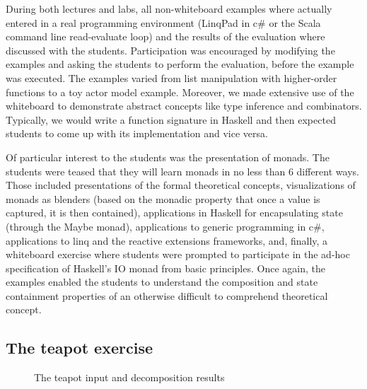 \documentclass[conference]{sig-alternate}
\begin{document}
During both lectures and labs, all non-whiteboard examples where actually
entered in a real programming environment (LinqPad in {\sc c\#} or the Scala
command line read-evaluate loop) and the results of the evaluation where
discussed with the students. Participation was encouraged by modifying the
examples and asking the students to perform the evaluation, before the example
was executed.
The examples varied from list manipulation with higher-order
functions to a toy actor model example.
Moreover, we made extensive use of the whiteboard to demonstrate abstract
concepts like type inference and combinators. Typically, we would
write a function signature in Haskell and then expected students to come up 
with its implementation and vice versa.

Of particular interest to the students was the presentation of monads. The
students were teased that they will learn monads in no less than 6 different
ways. Those included presentations of the formal theoretical concepts,
visualizations of monads as blenders (based on the monadic property that once a
value is captured, it is then contained), applications in Haskell for
encapsulating state (through the \textsf{Maybe} monad), applications to generic
programming in {\sc c\#}, applications to {\sc linq} and the reactive extensions
frameworks, and, finally, a whiteboard exercise where students were prompted to
participate in the ad-hoc specification of Haskell's \textsf{IO} monad from
basic principles. Once again, the examples enabled the students to understand
the composition and state containment properties of an otherwise difficult to
comprehend theoretical concept.

\subsection{The teapot exercise}

\begin{figure*}
\centering
\label{fig:teapots}

\caption[]{The teapot input and decomposition results}

\vspace{-1.5em}
\end{figure*}
\end{document}
